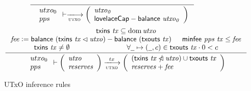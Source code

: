 \begin{figure}
  \begin{equation}\label{eq:utxo-bootstrap}
    \inference
    {
    }
    {
      {\begin{array}{l}
        utxo_0\\
        pps
      \end{array}}
      \vdash
      \trans{utxo}{}
      \left(
        \begin{array}{l}
          \var{utxo_0}\\
          \fun{lovelaceCap} - \balance{utxo_0}
        \end{array}
      \right)
    }
  \end{equation}
  \nextdef
  \begin{equation}\label{eq:utxo-inductive}
    \inference
    { \txins{tx} \subseteq \dom \var{utxo}\\
      \var{fee} \leteq \balance{(\txins{tx} \restrictdom \var{utxo})} - \balance{(\txouts{tx})}
      & \minfee{pps}{tx} \leq \var{fee}\\
      \txins{tx} \neq \emptyset & \forall \wcard \mapsto (\wcard, c) \in \txouts{tx} \cdot 0 < c
    }
    {
      {\begin{array}{l}
        utxo_0\\
        pps
      \end{array}}
      \vdash
      \left(
          \begin{array}{l}
            \var{utxo}\\
            \var{reserves}
          \end{array}
      \right)
      \trans{utxo}{tx}
      \left(
        \begin{array}{l}
          (\txins{tx} \subtractdom \var{utxo}) \cup \txouts{tx}\\
          \var{reserves + \var{fee}}
        \end{array}
      \right)
    }
  \end{equation}
  \caption{UTxO inference rules}
  \label{fig:rules:utxo}
\end{figure}

